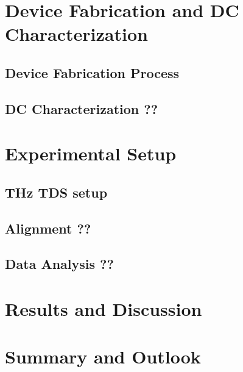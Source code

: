\documentclass[
	german,%
	accentcolor=9c,%
	ruledheaders=section,%
	class=report,%
	thesis={type=bachelor},%
	fontsize=11pt,%
	parskip=half-,%
	custommargins=false,%
	marginpar=false,%
	BCOR=5mm,%
 	logofile=tools/logo-installation/TUDa-logos/tuda_logo.png,%
]{tudapub}
\begin{document}
\chapter{Device Fabrication and DC Characterization}
\section{Device Fabrication Process}
\section{DC Characterization ??}

\chapter{Experimental Setup}
\section{THz TDS setup}
\section{Alignment ??}
\section{Data Analysis ??}

\chapter{Results and Discussion}

\chapter{Summary and Outlook}

\printbibliography
\end{document}
